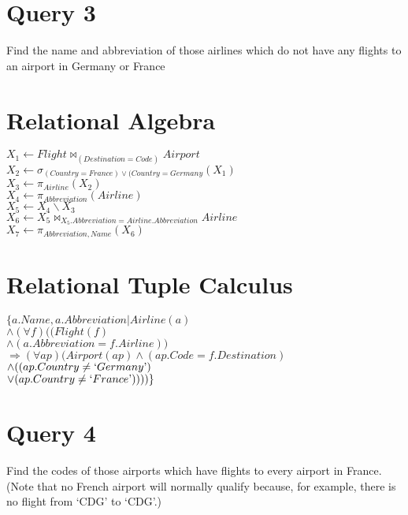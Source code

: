 \documentclass[a4paper,11pt,twoside]{article}
\begin{document}
\section{Query 3}
Find the name and abbreviation of those airlines which do not have any flights to an airport in Germany or France
 
\section{Relational Algebra}
$X_1 \leftarrow Flight \Join _{(Destination = Code)} Airport$\\
$X_2 \leftarrow \sigma_{(Country = France) \lor (Country = Germany}(X_1)$\\
$X_3 \leftarrow \pi_{Airline}(X_2)$\\
$X_4 \leftarrow \pi_{Abbreviation}(Airline)$\\
$X_5 \leftarrow X_4 \backslash X_3$\\
$X_6 \leftarrow X_5 \Join _{X_5.Abbreviation=Airline.Abbreviation} Airline$\\
$X_7 \leftarrow \pi_{Abbreviation, Name}(X_6)$\\



\section{Relational Tuple Calculus}
$\{a.Name, a.Abbreviation|Airline(a)$\\
$ \land (\forall f)((Flight(f)$\\
$ \land (a.Abbreviation = f.Airline))$\\
$ \Rightarrow (\forall ap)(Airport(ap) \land (ap.Code = f.Destination)$\\
$ \land ((ap.Country \neq `Germany\textrm')$\\
$ \lor (ap.Country \neq `France\textrm'))))\}$\\

\section{Query 4}
Find the codes of those airports which have flights to every airport in France. (Note that no French airport will normally qualify because, for example, there is no flight from `CDG' to `CDG'.)
\end{document}
